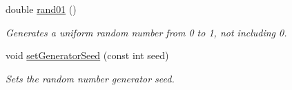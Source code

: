 \begin{DoxyCompactItemize}
\mbox{\label{class_simulation_a938de951b2766c6fb2b00cf9714caffa}} 
double \hyperlink{class_simulation_a938de951b2766c6fb2b00cf9714caffa}{rand01} ()
\begin{DoxyCompactList}\small\item\em Generates a uniform random number from 0 to 1, not including 0. \end{DoxyCompactList}\item 
void \hyperlink{class_simulation_a1a825b9da67da43104137662694655bd}{set\+Generator\+Seed} (const int seed)
\begin{DoxyCompactList}\small\item\em Sets the random number generator seed. \end{DoxyCompactList}\end{DoxyCompactItemize}
